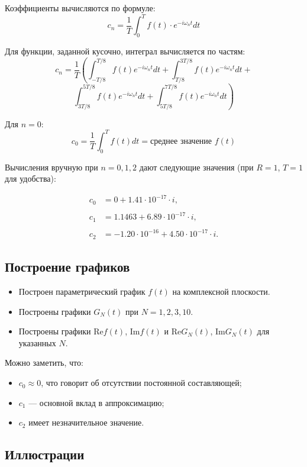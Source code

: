 Коэффициенты вычисляются по формуле:
\[
c_n = \frac{1}{T} \int_{0}^{T} f(t) \cdot e^{-i \omega_n t} dt
\]

Для функции, заданной кусочно, интеграл вычисляется по частям:
\[
c_n = \frac{1}{T} \left(
\int_{-T/8}^{T/8} f(t) e^{-i\omega_n t} dt +
\int_{T/8}^{3T/8} f(t) e^{-i\omega_n t} dt +
\right.
\]
\[
\left.
\int_{3T/8}^{5T/8} f(t) e^{-i\omega_n t} dt +
\int_{5T/8}^{7T/8} f(t) e^{-i\omega_n t} dt
\right)
\]

Для $n = 0$:
\[
c_0 = \frac{1}{T} \int_{0}^{T} f(t) dt = \text{среднее значение } f(t)
\]

Вычисления вручную при $n = 0, 1, 2$ дают следующие значения (при $R = 1$, $T = 1$ для удобства):

\begin{align*}
    c_0 &= 0 + 1.41 \cdot 10^{-17} \cdot i, \\\\
    c_1 &= 1.1463 + 6.89 \cdot 10^{-17} \cdot i, \\\\
    c_2 &= -1.20 \cdot 10^{-16} + 4.50 \cdot 10^{-17} \cdot i.
\end{align*}

\subsection*{Построение графиков}

\begin{itemize}
    \item Построен параметрический график $f(t)$ на комплексной плоскости.
    \item Построены графики $G_N(t)$ при $N = 1, 2, 3, 10$.
    \item Построены графики $\text{Re} f(t)$, $\text{Im} f(t)$ и $\text{Re} G_N(t)$, $\text{Im} G_N(t)$ для указанных $N$.
\end{itemize}

Можно заметить, что:
\begin{itemize}
    \item $c_0 \approx 0$, что говорит об отсутствии постоянной составляющей;
    \item $c_1$ — основной вклад в аппроксимацию;
    \item $c_2$ имеет незначительное значение.
\end{itemize}

\subsection*{Иллюстрации}

